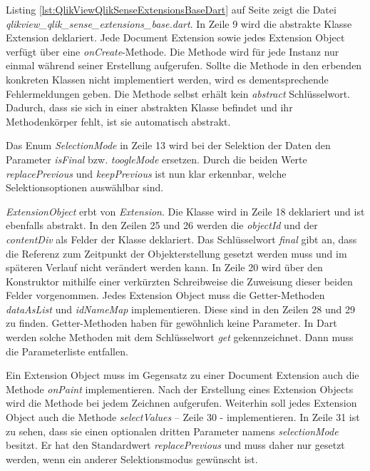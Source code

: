 Listing \ref{lst:QlikViewQlikSenseExtensionsBaseDart} auf Seite \pageref{lst:QlikViewQlikSenseExtensionsBaseDart} zeigt die Datei \textit{qlikview\_qlik\_sense\_extensions\_base.dart}. In Zeile 9 wird die abstrakte Klasse Extension deklariert. Jede Document Extension sowie jedes Extension Object verfügt über eine \textit{onCreate}-Methode. Die Methode wird für jede Instanz nur einmal während seiner Erstellung aufgerufen. Sollte die Methode in den erbenden konkreten Klassen nicht implementiert werden, wird es dementsprechende Fehler\-meldungen geben. Die Methode selbst erhält kein \textit{abstract} Schlüssel\-wort. Dadurch, dass sie sich in einer abstrakten Klasse befindet und ihr Methodenkörper fehlt, ist sie automatisch abstrakt.

Das Enum \textit{SelectionMode} in Zeile 13 wird bei der Selektion der Daten den Parameter \textit{isFinal} bzw. \textit{toogleMode} ersetzen. Durch die beiden Werte \textit{replacePrevious} und \textit{keepPrevious} ist nun klar erkennbar, welche Selektionsoptionen auswählbar sind.

\textit{ExtensionObject} erbt von \textit{Extension}. Die Klasse wird in Zeile 18 deklariert und ist ebenfalls abstrakt. In den Zeilen 25 und 26 werden die \textit{objectId} und der \textit{contentDiv} als Felder der Klasse deklariert. Das Schlüssel\-wort \textit{final} gibt an, dass die Referenz zum Zeitpunkt der Objekterstellung gesetzt werden muss und im späteren Verlauf nicht verändert werden kann. In Zeile 20 wird über den Konstruktor mithilfe einer verkürzten Schreibweise die Zuweisung dieser beiden Felder vorgenommen.
Jedes Extension Object muss die Getter-Methoden \textit{dataAsList} und \textit{idNameMap} implementieren. Diese sind in den Zeilen 28 und 29 zu finden. Getter-Methoden haben für gewöhnlich keine Parameter. In Dart werden solche Methoden mit dem Schlüssel\-wort \textit{get} gekennzeichnet. Dann muss die Parameterliste entfallen.

Ein Extension Object muss im Gegensatz zu einer Document Extension auch die Methode \textit{onPaint} implementieren. Nach der Erstellung eines Extension Objects wird die Methode bei jedem Zeichnen aufgerufen. Weiterhin soll jedes Extension Object auch die Methode \textit{selectValues} – Zeile 30 - implementieren. In Zeile 31 ist zu sehen, dass sie einen optionalen dritten Parameter namens \textit{selectionMode} besitzt. Er hat den Standardwert \textit{replacePrevious} und muss daher nur gesetzt werden, wenn ein anderer Selektionsmodus gewünscht ist.


